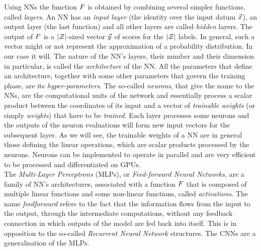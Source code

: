 Using NNs the function $F$ is obtained by combining several simpler functions, called \emph{layers}. An NN has an \emph{input layer} (the identity over the input datum $\vec{x}$), an output layer (the last function) and all other layers are called \emph{hidden} layers.  The output of $F$ is a $\lvert\mathcal{Z}\rvert$-sized vector $\vec{y}$ of scores for the $\lvert\mathcal{Z}\rvert$ labels. In general, such a vector might or not represent the approximation of a probability distribution. In our case it will. The nature of the NN's  layers, their number and their dimension in particular, is called the \emph{architecture} of the NN. All the parameters that define an architecture, together with some other parameters that govern the training phase, are its \emph{hyper-parameters}. The so-called \emph{neurons}, that give the name to the NNs, are the computational units of the network and essentially process a scalar product between the coordinates of its input and a vector of  \emph{trainable weights} (or simply \emph{weights}) that have to be \emph{trained}. Each layer processes some neurons and the outputs of the neuron evaluations will form new input vectors for the subsequent layer. As we will see, the trainable weights of a NN are in general those defining the linear operations, which are scalar products processed by the neurons. Neurons can be implemented to operate in parallel and are very efficient to be processed and differentiated on GPUs. \\


The {\em Multi-Layer Perceptrons} (MLPs), or \emph{Feed-forward Neural Networks}, are a family of NN's architectures, associated with a function $F$  that is composed of multiple linear functions and some non-linear functions, called {\em activations}. The name \emph{feedforward} refers to the fact that the information flows from  the input to the output, through the intermediate computations, without any feedback connection in which outputs of the model are fed back into itself.  This is in opposition to the so-called \emph{Recurrent Neural Network} structures. The CNNs are a generalisation of the MLPs.  \\

